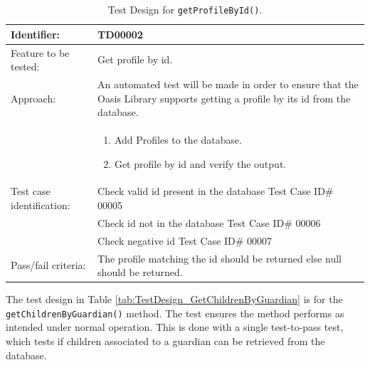 \begin{table}[htbp]
	\centering
		\begin{tabular}{| p{4.5cm} | m{9cm} |}
			\hline
			Identifier: 				& TD00002 \\ \hline
			Feature to be tested:		& Get profile by id. \\ \hline
			Approach:					& An automated test will be made in order to ensure that the Oasis Library supports getting a profile by its id from the database. \\
										&	\begin{enumerate}
												\item Add Profiles to the database.
												\item Get profile by id and verify the output.
											\end{enumerate} \\ \hline
			Test case identification: 	& Check valid id present in the database Test Case ID\# 00005 \\
										& Check id not in the database Test Case ID\# 00006 \\
										& Check negative id Test Case ID\# 00007 \\ \hline
			Pass/fail criteria:			& The profile matching the id should be returned else null should be returned. \\ \hline
		\end{tabular}
	\caption{Test Design for \texttt{getProfileById()}.}
	\label{tab:TestDesign_GetProfileById}
\end{table}

The test design in Table \vref{tab:TestDesign_GetChildrenByGuardian} is for the \texttt{getChildrenByGuardian()} method.
The test ensures the method performs as intended under normal operation.
This is done with a single test-to-pass test, which tests if children associated to a guardian can be retrieved from the database.

